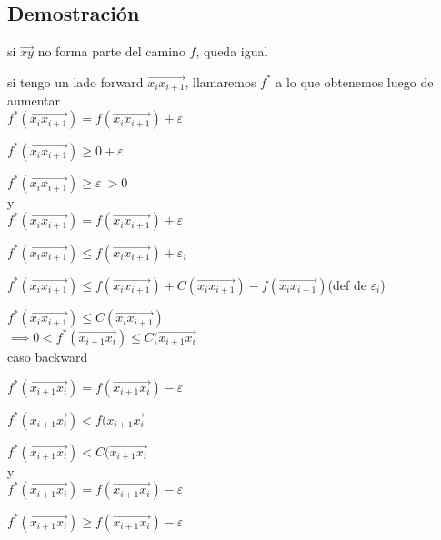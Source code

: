 \documentclass[12pt]{article}
\begin{document}
\subsection*{Demostración}

si $\overrightarrow{xy}$ no forma parte del camino $f$, queda igual

si tengo un lado forward $\overrightarrow{x_{i}x_{i+1}}$, llamaremos $f^*$ a lo que obtenemos luego de aumentar\\

\(f^*(\overrightarrow{x_{i}x_{i+1}}) = f(\overrightarrow{x_{i}x_{i+1}}) + \varepsilon\)

\(f^*(\overrightarrow{x_{i}x_{i+1}}) \geq 0 + \varepsilon\)

\(f^*(\overrightarrow{x_{i}x_{i+1}}) \geq  \varepsilon\ > 0\)\\



y\\

\(f^*(\overrightarrow{x_{i}x_{i+1}}) = f(\overrightarrow{x_{i}x_{i+1}}) + \varepsilon\)

\(f^*(\overrightarrow{x_{i}x_{i+1}}) \leq f(\overrightarrow{x_{i}x_{i+1}}) + \varepsilon_i \)

\(f^*(\overrightarrow{x_{i}x_{i+1}}) \leq  f(\overrightarrow{x_{i}x_{i+1}}) +  C(\overrightarrow{x_{i}x_{i+1}}) - f(\overrightarrow{x_{i}x_{i+1}})\)\hspace{18em}(def de $\varepsilon_i$)

\(f^*(\overrightarrow{x_{i}x_{i+1}}) \leq C(\overrightarrow{x_{i}x_{i+1}}) \)\\

\(\implies 0 < f^*(\overrightarrow{x_{i+1}x_{i}}) \leq C(\overrightarrow{x_{i+1}x_{i}} \)\\

caso backward

\(f^*(\overrightarrow{x_{i+1}x_{i}}) = f(\overrightarrow{x_{i+1}x_{i}}) - \varepsilon\)

\(f^*(\overrightarrow{x_{i+1}x_{i}}) < f(\overrightarrow{x_{i+1}x_{i}}\)

\(f^*(\overrightarrow{x_{i+1}x_{i}}) < C(\overrightarrow{x_{i+1}x_{i}}\)\\

y \\

\(f^*(\overrightarrow{x_{i+1}x_{i}}) = f(\overrightarrow{x_{i+1}x_{i}}) - \varepsilon\)

\(f^*(\overrightarrow{x_{i+1}x_{i}}) \geq f(\overrightarrow{x_{i+1}x_{i}}) - \varepsilon\)
\end{document}
